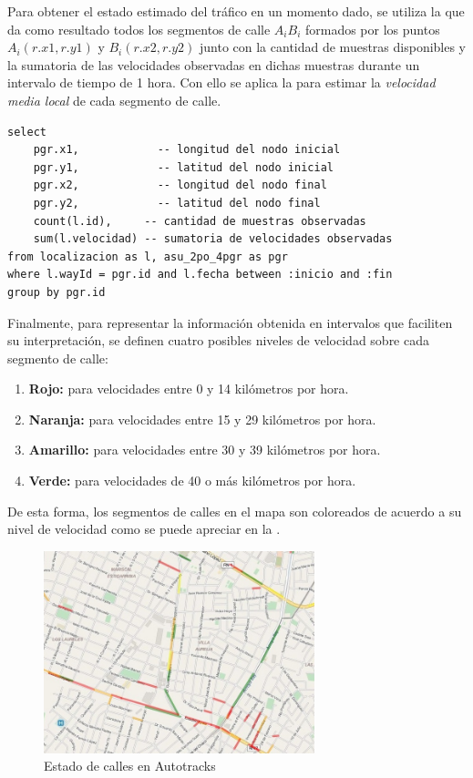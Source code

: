 Para obtener el estado estimado del tráfico en un momento dado, se utiliza la  que da como resultado todos los segmentos de calle $A_iB_i$ formados por los puntos $A_i(r.x1, r.y1)$ y $B_i(r.x2, r.y2)$ junto con la cantidad de muestras disponibles y la sumatoria de las velocidades observadas en dichas muestras durante un intervalo de tiempo de 1 hora. Con ello se aplica la  para estimar la \emph{velocidad media local} de cada segmento de calle.

\begin{lstlisting}[float,floatplacement=tbh,caption={Obtención de datos de tráfico}, label={lst:trafico}]
select 
    pgr.x1,            -- longitud del nodo inicial
    pgr.y1,            -- latitud del nodo inicial
    pgr.x2,            -- longitud del nodo final
    pgr.y2,            -- latitud del nodo final
    count(l.id),     -- cantidad de muestras observadas
    sum(l.velocidad) -- sumatoria de velocidades observadas
from localizacion as l, asu_2po_4pgr as pgr
where l.wayId = pgr.id and l.fecha between :inicio and :fin
group by pgr.id
\end{lstlisting}

Finalmente, para representar la información obtenida en intervalos que faciliten su interpretación, se definen cuatro posibles niveles de velocidad sobre cada segmento de calle:
\begin{enumerate}
\item \textbf{Rojo:}  para velocidades entre 0 y 14 kilómetros por hora.
\item \textbf{Naranja:}  para velocidades entre 15 y 29 kilómetros por hora.
\item \textbf{Amarillo:}  para velocidades entre 30 y 39 kilómetros por hora.
\item \textbf{Verde:}  para velocidades de 40 o más kilómetros por hora.
\end{enumerate}
De esta forma, los segmentos de calles en el mapa son coloreados de acuerdo a su nivel de velocidad como se puede apreciar en la .
\begin{figure}[h]
	\centering
	\includegraphics[width=0.7\textwidth]{capitulos/6/figuras/figura3.jpg}
	\caption{\label{fig:calles} Estado de calles en Autotracks}	
\end{figure}
